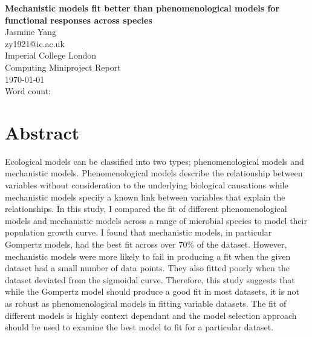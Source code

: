 \documentclass[11pt, a4paper]{article}
\begin{document}
\sloppy

\begin{titlepage}
\begin{center}

\vspace*{4cm}
\Huge{\textbf{Mechanistic models fit better than phenomenological models for functional responses across species}}\\[5mm]
\huge{Jasmine Yang}\\[1mm]
\large{zy1921@ic.ac.uk}\\[3mm]
\Large{Imperial College London}\\

\vspace*{9cm}
\Large{Computing Miniproject Report}\\[3mm]
\today\\[5mm]
\large{Word count: }

\end{center}
\end{titlepage}

\section{Abstract}
Ecological models can be classified into two types; phenomenological models and mechanistic models. Phenomenological models describe the relationship between variables without consideration to the underlying biological causations while mechanistic models specify a known link between variables that explain the relationships. In this study, I compared the fit of different phenomenological models and mechanistic models across a range of microbial species to model their population growth curve. I found that mechanistic models, in particular Gompertz models, had the best fit across over 70\% of the dataset. However, mechanistic models were more likely to fail in producing a fit when the given dataset had a small number of data points. They also fitted poorly when the dataset deviated from the sigmoidal curve. Therefore, this study suggests that while the Gompertz model should produce a good fit in most datasets, it is not as robust as phenomenological models in fitting variable datasets. The fit of different models is highly context dependant and the model selection approach should be used to examine the best model to fit for a particular dataset. 
\end{document}

